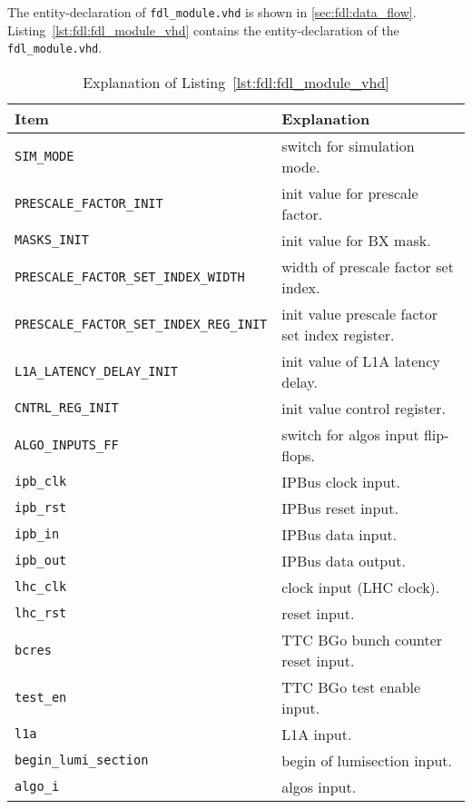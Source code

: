 The entity-declaration of \texttt{fdl\_module.vhd} is shown in \ref{sec:fdl:data_flow}.\\

Listing~\ref{lst:fdl:fdl_module_vhd} contains the entity-declaration of the \texttt{fdl\_module.vhd}.\\



\medskip
\begin{table}
\footnotesize
\caption{Explanation of Listing~\ref{lst:fdl:fdl_module_vhd}}
\vspace{5mm}
\centering
\begin{tabular}{l p{}}
\toprule
{Item} & {Explanation}\\
\midrule
\verb|SIM_MODE| & switch for simulation mode.\\
\verb|PRESCALE_FACTOR_INIT| & init value for prescale factor.\\
\verb|MASKS_INIT| & init value for BX mask.\\
\verb|PRESCALE_FACTOR_SET_INDEX_WIDTH| & width of prescale factor set index.\\
\verb|PRESCALE_FACTOR_SET_INDEX_REG_INIT| & init value prescale factor set index register.\\
\verb|L1A_LATENCY_DELAY_INIT| & init value of L1A latency delay.\\
\verb|CNTRL_REG_INIT| & init value control register.\\
\verb|ALGO_INPUTS_FF| & switch for algos input flip-flops.\\
\verb|ipb_clk| & IPBus clock input.\\
\verb|ipb_rst| & IPBus reset input.\\
\verb|ipb_in| & IPBus data input.\\
\verb|ipb_out| & IPBus data output.\\
\verb|lhc_clk| & clock input (LHC clock).\\
\verb|lhc_rst| & reset input.\\
\verb|bcres| & TTC BGo bunch counter reset input.\\
\verb|test_en| & TTC BGo test enable input.\\
\verb|l1a| & L1A input.\\
\verb|begin_lumi_section| & begin of lumisection input.\\
\verb|algo_i| & algos input.\\

\end{tabular}
\end{table}
